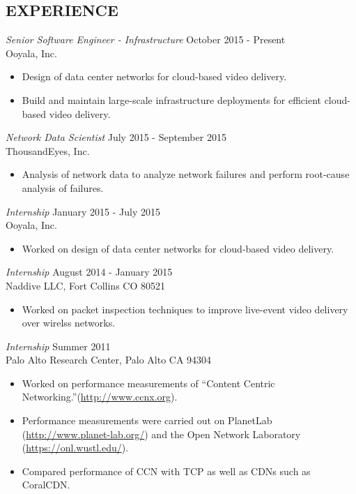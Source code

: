 \documentclass[line,margin]{res}
\begin{document}
\begin{resume}
\section{EXPERIENCE}
    {\sl Senior Software Engineer - Infrastructure} \hfill October 2015 - Present\\
    Ooyala, Inc.
    \begin{itemize}
        \item Design of data center networks for cloud-based video delivery.
        \item Build and maintain large-scale infrastructure deployments for efficient cloud-based video delivery.
    \end{itemize}
	{\sl Network Data Scientist} \hfill July 2015 - September 2015\\
	ThousandEyes, Inc.
	\begin{itemize}
		\item Analysis of network data to analyze network failures and perform
			root-cause analysis of failures.
		\end{itemize}
	{\sl Internship} \hfill January 2015 - July 2015\\
	Ooyala, Inc.
	\begin{itemize}
		\item Worked on design of data center networks for cloud-based video
			delivery.
	\end{itemize}
	{\sl Internship} \hfill August 2014 - January 2015\\
	Naddive LLC, Fort Collins CO 80521
	\begin{itemize}
		\item Worked on packet inspection techniques to improve live-event video
			delivery over wirelss networks.
	\end{itemize}
    {\sl Internship} \hfill Summer 2011\\
      Palo Alto Research Center, Palo Alto CA 94304
      \begin{itemize}
      \item Worked on performance measurements of ``Content Centric
		  Networking.''(\url{http://www.ccnx.org}).
      \item Performance measurements were carried out on PlanetLab (\url{http://www.planet-lab.org/}) and the Open Network
      Laboratory (\url{https://onl.wustl.edu/}).
      \item Compared performance of CCN with TCP as well as CDNs such as CoralCDN.
      \end{itemize}


\end{resume}
\end{document}
